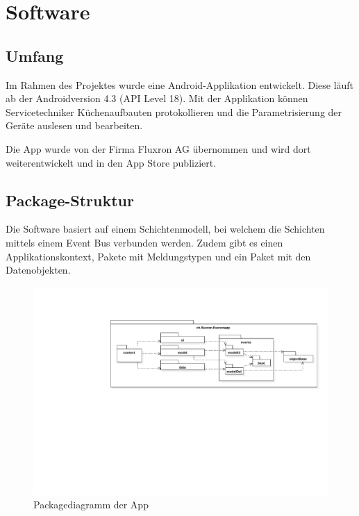 \section{Software}

\subsection{Umfang}

Im Rahmen des Projektes wurde eine Android-Applikation entwickelt. Diese läuft ab der Androidversion 4.3 (API Level 18). Mit der Applikation können Servicetechniker Küchenaufbauten protokollieren und die Parametrisierung der Geräte auslesen und bearbeiten.

Die App wurde von der Firma Fluxron AG übernommen und wird dort weiterentwickelt und in den App Store publiziert.

\subsection{Package-Struktur}

Die Software basiert auf einem Schichtenmodell, bei welchem die Schichten mittels einem Event Bus verbunden werden. Zudem gibt es einen Applikationskontext, Pakete mit Meldungstypen und ein Paket mit den Datenobjekten. 

\begin{figure}[H]
    \begin{center}
        \includegraphics[trim=220 300 0 90,clip,scale=0.7]{results/res/package_diagram}
    \end{center}
    \caption{Packagediagramm der App}
    \label{abb:packages}
\end{figure}

